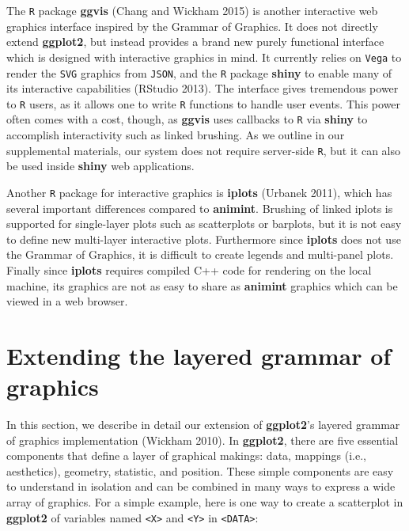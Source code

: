 \documentclass[12pt,]{article}
\theoremstyle{definition}
\theoremstyle{definition}
\theoremstyle{definition}
\theoremstyle{remark}
\begin{document}
The \texttt{R} package \textbf{ggvis} (Chang and Wickham 2015) is
another interactive web graphics interface inspired by the Grammar of
Graphics. It does not directly extend \textbf{ggplot2}, but instead
provides a brand new purely functional interface which is designed with
interactive graphics in mind. It currently relies on \texttt{Vega} to
render the \texttt{SVG} graphics from \texttt{JSON}, and the \texttt{R}
package \textbf{shiny} to enable many of its interactive capabilities
(RStudio 2013). The interface gives tremendous power to \texttt{R}
users, as it allows one to write \texttt{R} functions to handle user
events. This power often comes with a cost, though, as \textbf{ggvis}
uses callbacks to \texttt{R} via \textbf{shiny} to accomplish
interactivity such as linked brushing. As we outline in our supplemental
materials, our system does not require server-side \texttt{R}, but it
can also be used inside \textbf{shiny} web applications.

Another \texttt{R} package for interactive graphics is \textbf{iplots}
(Urbanek 2011), which has several important differences compared to
\textbf{animint}. Brushing of linked iplots is supported for
single-layer plots such as scatterplots or barplots, but it is not easy
to define new multi-layer interactive plots. Furthermore since
\textbf{iplots} does not use the Grammar of Graphics, it is difficult to
create legends and multi-panel plots. Finally since \textbf{iplots}
requires compiled C++ code for rendering on the local machine, its
graphics are not as easy to share as \textbf{animint} graphics which can
be viewed in a web browser.

\hypertarget{extending-the-layered-grammar-of-graphics}{%
\section{Extending the layered grammar of
graphics}\label{extending-the-layered-grammar-of-graphics}}

In this section, we describe in detail our extension of
\textbf{ggplot2}'s layered grammar of graphics implementation (Wickham
2010). In \textbf{ggplot2}, there are five essential components that
define a layer of graphical makings: data, mappings (i.e., aesthetics),
geometry, statistic, and position. These simple components are easy to
understand in isolation and can be combined in many ways to express a
wide array of graphics. For a simple example, here is one way to create
a scatterplot in \textbf{ggplot2} of variables named
\texttt{\textless{}X\textgreater{}} and
\texttt{\textless{}Y\textgreater{}} in
\texttt{\textless{}DATA\textgreater{}}:
\end{document}
